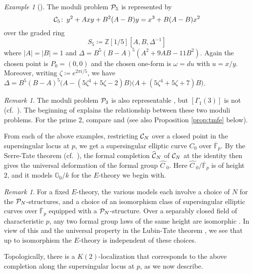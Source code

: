 \documentclass{gtpart}
\theoremstyle{definition}
\theoremstyle{remark}
\newtheorem{rmk}[thm]{Remark}
\newtheorem{ex}[thm]{Example}
\def\co{\colon\thinspace}
\newcommand{\mb}[1]{\mathbb{#1}}
\newcommand{\cF}{\overline {\mb F}}
\newcommand{\CC}{{\cal C}}
\newcommand{\CP}{{\cal P}}
\newcommand{\BG}{{\mb G}}
\newcommand{\BZ}{{\mb Z}}
\newcommand{\HC}{\widehat{C~}\!}
\newcommand{\HCC}{\widehat{~\!\!\CC}}
\renewcommand{\D}{\Delta}
\newcommand{\G}{\Gamma}
\renewcommand{\o}{\omega}
\newcommand{\ce}{\coloneqq}
\renewcommand{\=}{\approx}
\renewcommand{\-}{\sim}
\numberwithin{equation}{section}
\numberwithin{thm}{section}
\begin{document}
\begin{ex}[{\cite[Corollary 1.1.10]{tmf5}}]
 \label{ex:5}
 The moduli problem $\CP_5$ is represented by 
 \[
  \CC_5 \co y^2 + A x y + B^2 (A - B) y = x^3 + B (A - B) x^2 
 \]
 over the graded ring 
 \[
  S_5 \ce \BZ[1/5][A, B, \D^{-1}] 
 \]
 where $|A| = |B| = 1$ and $\D = B^5 (B - A)^5 (A^2 + 9 A B - 11 B^2)$.  Again 
 the chosen point is $P_0 = (0,0)$ and the chosen one-form is $\o = du$ with 
 $u = x / y$.  Moreover, writing $\zeta \ce e^{2 \pi i / 5}$, we have $\D = B^5 
 (B - A)^5 \big( A - (5 \zeta^4 + 5 \zeta - 2) B \big) \big( A + (5 \zeta^4 + 5 
 \zeta + 7) B \big)$.  
\end{ex}

\begin{rmk}
 \label{rmk:tmf3}
 The moduli problem $\CP_3$ is also representable \cite[Proposition 3.2]{tmf3}, 
 but $[\G_1(3)]$ is not (cf.~\cite[Corollary 2.7.4]{KM}).  The beginning of 
 \cite[Section 1]{tmf5} explains the relationship between these two moduli 
 problems.  For the prime 2, compare \cite[Corollary 1.1.11]{tmf5} and 
 \cite[Section 3.1]{level3II} (see also Proposition \ref{prop:tmfe} below).  
\end{rmk}

From each of the above examples, restricting $\CC_N$ over a closed point in the 
supersingular locus at $p$, we get a supersingular elliptic curve $C_0$ over 
$\cF_p$.  By the Serre-Tate theorem \cite{LST} (cf.~\cite[Theorem 2.9.1]{KM}), 
the formal completion $\HCC_N$ of $\CC_N$ at the identity then gives the 
universal deformation of the formal group $\HC_0$.  Here $\HC_0 / \cF_p$ is of 
height 2, and it models $\BG_0 / k$ for the $E$-theory we begin with.  

\begin{rmk}
 \label{rmk:N}
 For a fixed $E$-theory, the various models each involve a choice of $N$ for the 
 $\CP_N$-structures, and a choice of an isomorphism class of supersingular 
 elliptic curves over $\cF_p$ equipped with a $\CP_N$-structure.  Over a 
 separably closed field of characteristic $p$, any two formal group laws of the 
 same height are isomorphic \cite[Th\'eor\`eme IV]{Lazard}.  In view of this and 
 the universal property in the Lubin-Tate theorem \cite[Theorem 3.1]{LT}, we see 
 that up to isomorphism the $E$-theory is independent of these choices.  
\end{rmk}

Topologically, there is a $K(2)$-localization that corresponds to the above 
completion along the supersingular locus at $p$, as we now describe.  
\end{document}
